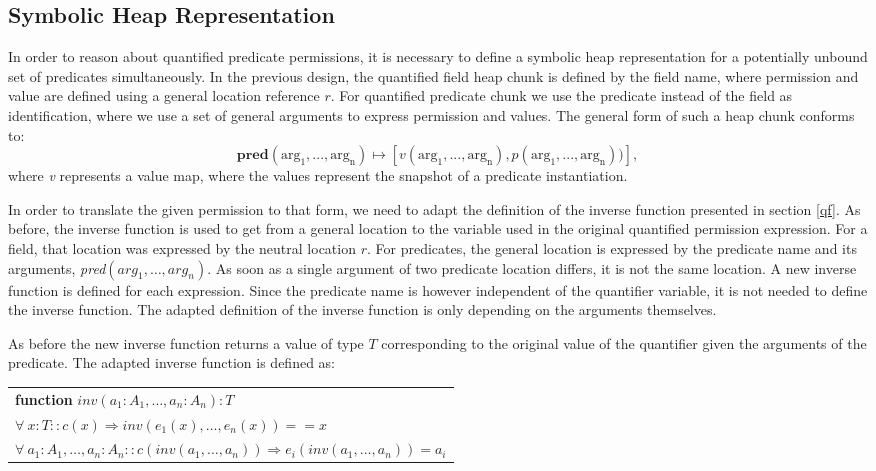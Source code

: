 \documentclass[12pt]{article}
\begin{document}
\subsection{Symbolic Heap Representation} \label{shr}
In order to reason about quantified predicate permissions, it is necessary to define a symbolic heap representation for a potentially unbound set of predicates simultaneously. In the previous design, the quantified field heap chunk is defined by the field name, where permission and value are defined using a general location reference \(r\).
For quantified predicate chunk we use the predicate instead of the field as identification, where we use a set of general arguments to express permission and values. The general form of such a heap chunk conforms to:
\begin{equation}
	\mathbf{pred}(\mathrm{arg_1, ..., arg_n})\mapsto [v(\mathrm{arg_1, ..., arg_n}), p(\mathrm{arg_1, ..., arg_n}))],
\end{equation}
where \textit{v} represents a value map, where the values represent the snapshot of a predicate instantiation.

In order to translate the given permission to that form, we need to adapt the definition of the inverse function presented in section \ref{qf}. As before, the inverse function is used to get from a general location to the variable used in the original quantified permission expression. For a field, that location was expressed by the neutral location \(r\). For predicates, the general location is expressed by the predicate name and its arguments, \textit{pred}\((arg_1, \dots, arg_n)\). As soon as a single argument of two predicate location differs, it is not the same location.
A new inverse function is defined for each expression. Since the predicate name is however independent of the quantifier variable, it is not needed to define the inverse function. The adapted definition of the inverse function is only depending on the arguments themselves.

As before the new inverse function returns a value of type \(T\) corresponding to the original value of the quantifier given the arguments of the predicate. The adapted inverse function is defined as:\\

\begin{tabularx}{1\textwidth}{ X}
\textbf{function }\(inv(a_1:A_1, \dots, a_n:A_n): T\) \\
\(\forall \ x:T :: c(x) \Rightarrow inv(e_1 (x),…,e_n (x))==x \) \\
\( \forall \ a_1:A_1,\dots, a_n:A_n ::  c(inv(a_1, …,a_n )) \Rightarrow e_i (inv(a_1,\dots, a_n )) = a_i \) \\
\end{tabularx}\\
\end{document}
